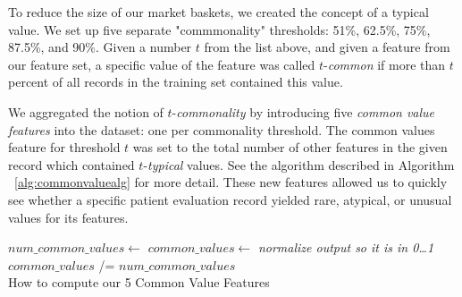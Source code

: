 To reduce the size of our market baskets, we created the concept of a \textsf{typical value}. We set up five separate "commmonality" thresholds: 51\%, 62.5\%,
75\%, 87.5\%, and 90\%.  Given a number $t$ from the list above, and given
a feature from our feature set,
a specific value of the feature was called $t$-\textit{common} if more
than $t$ percent of all records in the training set contained this value.

\par{
We aggregated the notion of $t$-\textit{commonality} by introducing
five \textit{common value features} into the dataset: one per commonality
threshold. The common values feature for threshold $t$ was set to the total number of other features in the given record which contained $t$-\textit{typical} values. See the algorithm described in Algorithm ~\ref{alg:commonvaluealg} for more detail.
These new features allowed us to quickly see whether a specific patient evaluation record yielded rare, atypical, or unusual values for its features.
}


\begin{algorithm}[h] 
 
 
 \BlankLine
 $num\_common\_values \gets$  \;
 $common\_values \gets$  \;
 \emph{normalize output so it is in 0\ldots1} \\ 
 $common\_values$ /= $num\_common\_values$ \\
 \caption{How to compute our 5 Common Value Features}
 \label{alg:commonvaluealg}
\end{algorithm}
